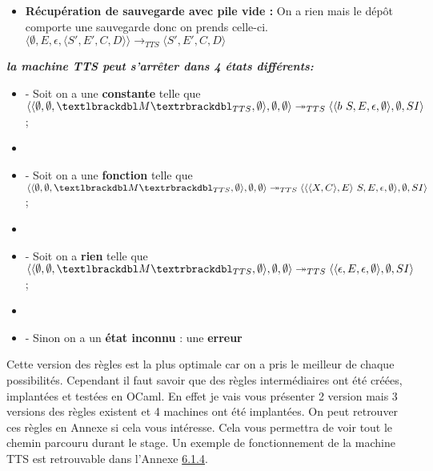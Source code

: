 \documentclass[10pt,a4paper]{report}
\begin{document}
\begin{enumerate}
\begin{itemize}
  \item[] \textbf{Récupération de sauvegarde avec pile vide :}  On a rien mais le dépôt comporte une sauvegarde donc on prends celle-ci.
    \smallbreak  
    $\langle \emptyset,E,\epsilon,\langle S',E',C,D\rangle\rangle
    \longrightarrow_{TTS} 
    \langle S',E',C,D\rangle$
  \end{itemize}
\end{enumerate}
\bigbreak
\bigbreak




\textbf{\textit{la machine TTS peut s'arrêter dans 4 états différents:}}
\smallbreak
\begin{itemize}
\item[] - Soit on a une \textbf{constante} telle que 
  $\langle\langle \emptyset,\emptyset,\textlbrackdbl M\textrbrackdbl_{TTS},\emptyset\rangle,\emptyset,\emptyset\rangle 
  \twoheadrightarrow_{TTS} 
  \langle\langle b~S,E,\epsilon,\emptyset\rangle,\emptyset,SI\rangle$;
\item[] 
\item[] - Soit on a une \textbf{fonction} telle que
  $\langle\langle \emptyset,\emptyset,\textlbrackdbl M\textrbrackdbl_{TTS},\emptyset\rangle,\emptyset,\emptyset\rangle 
  \twoheadrightarrow_{TTS} 
  \langle\langle\langle X,C\rangle,E\rangle~S,E,\epsilon,\emptyset\rangle,\emptyset,SI\rangle$;
\item[]
\item[] - Soit on a \textbf{rien} telle que
	$\langle\langle \emptyset,\emptyset,\textlbrackdbl M\textrbrackdbl_{TTS},\emptyset\rangle,\emptyset,\emptyset\rangle 
	\twoheadrightarrow_{TTS} 
	\langle\langle\epsilon,E,\epsilon,\emptyset\rangle,\emptyset,SI\rangle$;
\item[]  
\item[] - Sinon on a un \textbf{état inconnu} : une \textbf{erreur} 
\end{itemize}
\bigbreak
\bigbreak




Cette version des règles est la plus optimale car on a pris le meilleur de chaque possibilités. Cependant il faut savoir que des règles intermédiaires ont été créées, implantées et testées en OCaml. En effet je vais vous présenter 2 version mais 3 versions des règles existent et 4 machines ont été implantées. On peut retrouver ces règles en Annexe si cela vous intéresse. Cela vous permettra de voir tout le chemin parcouru durant le stage. Un exemple de fonctionnement de la machine TTS est retrouvable dans l'Annexe \hyperref[TTS]{6.1.4}.
\newpage
\end{document}
